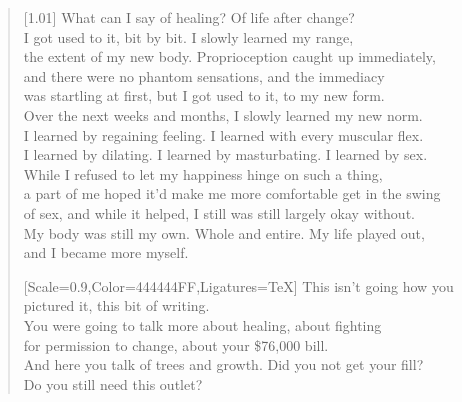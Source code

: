 \begin{verse}[1.01\textwidth]
  What can I say of healing? Of life after change?\\
  I got used to it, bit by bit. I slowly learned my range,\\
  the extent of my new body. Proprioception caught up immediately,\\
  and there were no phantom sensations, and the immediacy\\
  was startling at first, but I got used to it, to my new form.\\
  Over the next weeks and months, I slowly learned my new norm.\\
  I learned by regaining feeling. I learned with every muscular flex.\\
  I learned by dilating. I learned by masturbating. I learned by sex.\\
  While I refused to let my happiness hinge on such a thing,\\
  a part of me hoped it'd make me more comfortable get in the swing\\
  of sex, and while it helped, I still was still largely okay without.\\
  My body was still my own. Whole and entire. My life played out,\\
  and I became more myself.

  {[Scale=0.9,Color=444444FF,Ligatures=TeX]
  \vin This isn't going how you pictured it, this bit of writing.\\
  \vin You were going to talk more about healing, about fighting\\
  \vin for permission to change, about your \$76,000 bill.\\
  \vin And here you talk of trees and growth. Did you not get your fill?\\
  \vin Do you still need this outlet?}


\end{verse}
